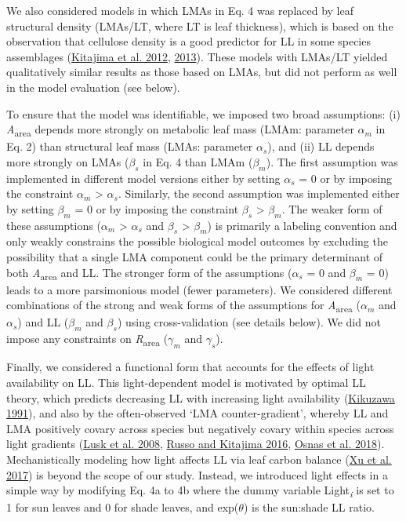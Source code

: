 \documentclass[
  12pt,
  letterpaper,
  DIV=11,
  numbers=noendperiod]{scrartcl}
\begin{document}
We also considered models in which LMAs in Eq. 4 was replaced by leaf
structural density (LMAs/LT, where LT is leaf thickness), which is based
on the observation that cellulose density is a good predictor for LL in
some species assemblages (\protect\hyperlink{ref-Kitajima2012}{Kitajima
et al. 2012}, \protect\hyperlink{ref-Kitajima2013}{2013}). These models
with LMAs/LT yielded qualitatively similar results as those based on
LMAs, but did not perform as well in the model evaluation (see below).

To ensure that the model was identifiable, we imposed two broad
assumptions: (i) \emph{A}\textsubscript{area} depends more strongly on
metabolic leaf mass (LMAm: parameter \(\alpha_m\) in Eq. 2) than
structural leaf mass (LMAs: parameter \(\alpha_s\)), and (ii) LL depends
more strongly on LMAs (\(\beta_s\) in Eq. 4 than LMAm (\(\beta_m\)). The
first assumption was implemented in different model versions either by
setting \(\alpha_s\) = 0 or by imposing the constraint \(\alpha_m\)
\textgreater{} \(\alpha_s\). Similarly, the second assumption was
implemented either by setting \(\beta_m\) = 0 or by imposing the
constraint \(\beta_s\) \textgreater{} \(\beta_m\). The weaker form of
these assumptions (\(\alpha_m\) \textgreater{} \(\alpha_s\) and
\(\beta_s\) \textgreater{} \(\beta_m\)) is primarily a labeling
convention and only weakly constrains the possible biological model
outcomes by excluding the possibility that a single LMA component could
be the primary determinant of both \emph{A}\textsubscript{area} and LL.
The stronger form of the assumptions (\(\alpha_s\) = 0 and \(\beta_m\) =
0) leads to a more parsimonious model (fewer parameters). We considered
different combinations of the strong and weak forms of the assumptions
for \emph{A}\textsubscript{area} (\(\alpha_m\) and \(\alpha_s\)) and LL
(\(\beta_m\) and \(\beta_s\)) using cross-validation (see details
below). We did not impose any constraints on
\emph{R}\textsubscript{area} (\(\gamma_m\) and \(\gamma_s\)).

Finally, we considered a functional form that accounts for the effects
of light availability on LL. This light-dependent model is motivated by
optimal LL theory, which predicts decreasing LL with increasing light
availability (\protect\hyperlink{ref-Kikuzawa1991}{Kikuzawa 1991}), and
also by the often-observed `LMA counter-gradient', whereby LL and LMA
positively covary across species but negatively covary within species
across light gradients (\protect\hyperlink{ref-Lusk2008}{Lusk et al.
2008}, \protect\hyperlink{ref-Russo2016}{Russo and Kitajima 2016},
\protect\hyperlink{ref-Osnas2018}{Osnas et al. 2018}). Mechanistically
modeling how light affects LL via leaf carbon balance
(\protect\hyperlink{ref-Xu2017}{Xu et al. 2017}) is beyond the scope of
our study. Instead, we introduced light effects in a simple way by
modifying Eq. 4a to 4b where the dummy variable
Light\textsubscript{\emph{i}} is set to 1 for sun leaves and 0 for shade
leaves, and exp(\(\theta\)) is the sun:shade LL ratio.
\end{document}
